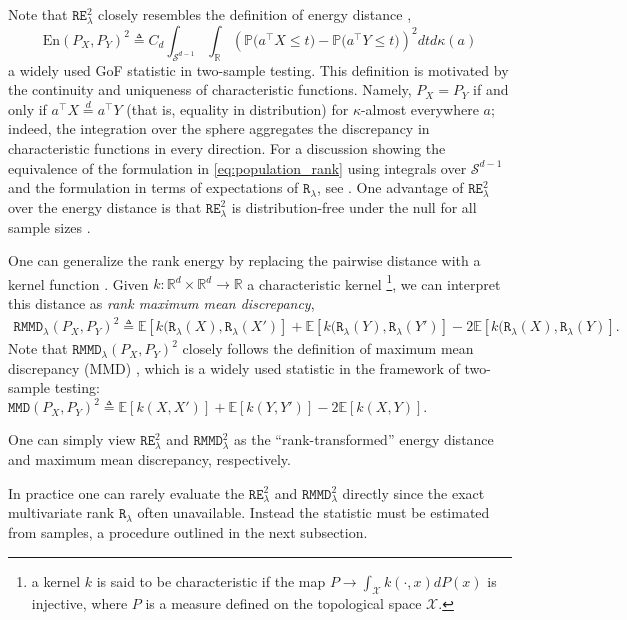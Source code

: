 \documentclass{article}
\theoremstyle{definition}
\newcommand{\R}{\mathtt{R}_{\lambda}}
\newcommand{\RE}{\mathtt{RE}_{\lambda}}
\begin{document}
Note that $\RE^2$ closely resembles the definition of energy distance \cite{szekely2013energy},
\begin{equation*}
    \text{En}(P_X,P_Y)^2 \triangleq  C_d \int_{\mathcal S^{d-1}}\int_{\mathbb R} \left (\mathbb P\big(a^\top X\leq t\big) - \mathbb P\big(a^\top Y\leq t\big) \right)^2 dt  d\kappa(a)
\end{equation*}
a widely used GoF statistic in two-sample testing. This definition is motivated by the continuity and uniqueness of characteristic functions. Namely, $P_X = P_Y$ if and only if $a^\top X \overset{d}{=} a^\top Y$ (that is, equality in distribution) for $\kappa$-almost everywhere $a$; indeed, the integration over the sphere aggregates the discrepancy in characteristic functions in every direction. For a discussion showing the equivalence of the formulation in \eqref{eq:population_rank} using integrals over $\mathcal{S}^{d-1}$ and the formulation in terms of expectations of $\R$, see \cite{baringhaus2004new}.  One advantage of  $\RE^2$ over the energy distance is that $\RE^2$ is distribution-free under the null for all sample sizes \cite{deb2021multivariate}.

One can generalize the rank energy by replacing the pairwise distance with a kernel function \cite{phillips2011gentle}. Given $k:\mathbb{R}^d \times \mathbb{R}^d \rightarrow \mathbb{R}$ a characteristic kernel \footnote{a kernel $k$ is said to be characteristic if the map $P\rightarrow \int_{\mathcal X} k(\cdot, x)d P(x)$ is injective, where $P$ is a measure defined on the topological space $\mathcal X$.}, we can interpret this distance as \textit{rank maximum mean discrepancy},
\begin{align}\label{eq:rank_mmd}
        \mathtt{RMMD}_\lambda(P_X,P_Y)^2 \triangleq  \mathbb{E} [k(\R(X),\R(X')] + \mathbb{E} [k(\R(Y),\R(Y')]- 2\mathbb{E}[k(\R(X),\R(Y)].
\end{align}
Note that $\mathtt{RMMD}_\lambda(P_X,P_Y)^2$  closely follows the definition of maximum mean discrepancy (MMD) \cite{gretton2012kernel}, which is a widely used statistic in the framework of two-sample testing: $\mathtt{MMD}(P_X,P_Y)^2 \triangleq  \mathbb{E} [k(X,X')] + \mathbb{E} [k(Y,Y')]- 2\mathbb{E}[k(X,Y)].$

One can simply view $\RE^2$ and $\mathtt{RMMD}_\lambda^2$ as the ``rank-transformed'' energy distance and maximum mean discrepancy, respectively. 

In practice one can rarely evaluate the $\RE^2$ and $\mathtt{RMMD}_\lambda^2$ directly since the exact multivariate rank $\R$ often unavailable. Instead the statistic must be estimated from samples, a procedure outlined in the next subsection. 
\end{document}
